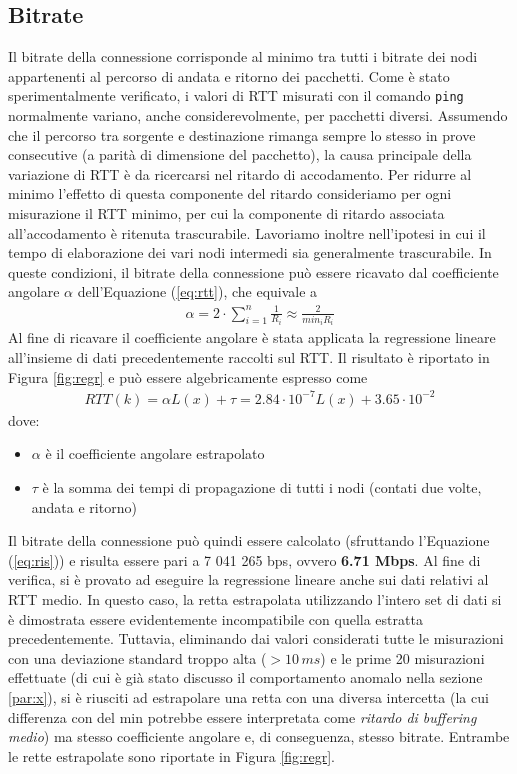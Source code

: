\documentclass[a4paper,10pt]{article}
\begin{document}
\subsection{Bitrate}
Il bitrate della connessione corrisponde al minimo tra tutti i bitrate dei nodi appartenenti al percorso di andata e ritorno dei pacchetti. Come è stato sperimentalmente verificato, i valori di RTT misurati con il comando \texttt{ping} normalmente variano, anche considerevolmente, per pacchetti diversi. Assumendo che il percorso tra sorgente e destinazione rimanga sempre lo stesso in prove consecutive (a parità di dimensione del pacchetto), la causa principale della variazione di RTT è da ricercarsi nel ritardo di accodamento. Per ridurre al minimo l'effetto di questa componente del ritardo consideriamo per ogni misurazione il RTT minimo, per cui la componente di ritardo associata all'accodamento è ritenuta trascurabile. Lavoriamo inoltre nell'ipotesi in cui il tempo di elaborazione dei vari nodi intermedi sia generalmente trascurabile. In queste condizioni, il bitrate della connessione può essere ricavato dal coefficiente angolare $\alpha$ dell'Equazione (\ref{eq:rtt}), che equivale a
\begin{align}
\alpha = 2 \cdot \sum_{i=1}^{n}  \frac{1}{R_i} \approx \frac{2}{min_i R_i}
\label{eq:ris}
\end{align}
Al fine di ricavare il coefficiente angolare è stata applicata la regressione lineare all'insieme di dati precedentemente raccolti sul RTT. Il risultato è riportato in Figura \ref{fig:regr} e può essere algebricamente espresso come
\begin{align}
RTT(k) = \alpha L(x) + \tau = 2.84 \cdot 10^{-7}  L(x) + 3.65 \cdot 10^{-2}
\end{align}
dove:
\begin{itemize}
\item $\alpha$ è il coefficiente angolare estrapolato
\item $\tau$ è la somma dei tempi di propagazione di tutti i nodi (contati due volte, andata e ritorno)
\end{itemize}
\noindent
Il bitrate della connessione può quindi essere calcolato (sfruttando l'Equazione (\ref{eq:ris})) e risulta essere pari a 7 041 265 bps, ovvero \textbf{6.71 Mbps}. Al fine di verifica, si è provato ad eseguire la regressione lineare anche sui dati relativi al RTT medio. In questo caso, la retta estrapolata utilizzando l'intero set di dati si è dimostrata essere evidentemente incompatibile con quella estratta precedentemente. Tuttavia, eliminando dai valori considerati tutte le misurazioni con una deviazione standard troppo alta ($>10\,ms$) e le prime 20 misurazioni effettuate (di cui è già stato discusso il comportamento anomalo nella sezione \ref{par:x}), si è riusciti ad estrapolare una retta con una diversa intercetta (la cui differenza con del min potrebbe essere interpretata come \textit{ritardo di buffering medio}) ma stesso coefficiente angolare e, di conseguenza, stesso bitrate. Entrambe le rette estrapolate sono riportate in Figura \ref{fig:regr}.
\end{document}
